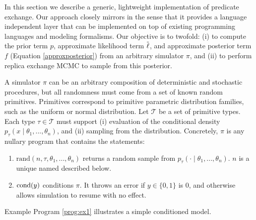 

In this section we describe a generic, lightweight implementation of predicate exchange.
Our approach closely mirrors \citep{wingate2011lightweight, milch20071} in the sense that it provides a language independent layer that can be implemented on top of existing programming languages and modeling formalisms.
Our objective is to twofold: (i) to compute the prior term $p$, approximate likelihood term $\tilde{\operatorname{\ell}}$, and approximate posterior term $f$ (Equation \ref{approxposterior}) from an arbitrary simulator $\pi$, and (ii) to perform replica exchange MCMC to sample from this posterior.

A simulator $\pi$ can be an arbitrary composition of deterministic and stochastic procedures, but all randomness must come from a set of known random primitives.
Primitives correspond to primitive parametric distribution families, such as the uniform or normal distribution.
Let $\mathcal{T}$ be a set of primitive types.
Each type $\tau \in \mathcal{T}$ must support (i) evaluation of the conditional density $p_\tau(x \mid \theta_1, ..., \theta_n)$, and (ii) sampling from the distribution.
Concretely, $\pi$ is any nullary program that contains the statements:

\begin{enumerate}
  \item $\textrm{rand}(n, \tau, \theta_1, ...,\theta_n)$ returns a random sample from $p_\tau(\cdot \mid \theta_1, ..., \theta_n)$.  $n$ is a unique named described below.
  \item $\operatorname{cond}(y)$ conditions $\pi$.  It throws an error if $y \in \{0, 1\}$ is 0, and otherwise allows simulation to resume with no effect.
\end{enumerate}

Example Program \ref{prog:ex1} illustrates a simple conditioned model.

